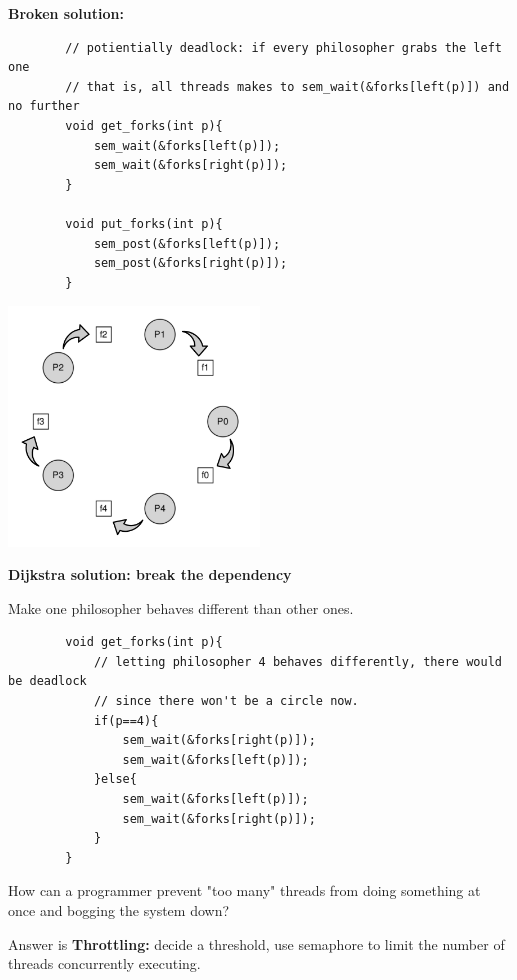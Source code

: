     \textbf{Broken solution:}

    \begin{lstlisting}
        // potientially deadlock: if every philosopher grabs the left one
        // that is, all threads makes to sem_wait(&forks[left(p)]) and no further
        void get_forks(int p){
            sem_wait(&forks[left(p)]);
            sem_wait(&forks[right(p)]);
        }

        void put_forks(int p){
            sem_post(&forks[left(p)]);
            sem_post(&forks[right(p)]);
        }
    \end{lstlisting}

    \includegraphics[width=0.5\textwidth]{chapters/Cucurrency/Cucurrency/dp_deadlock.png}

    \textbf{Dijkstra solution: break the dependency}

    Make one philosopher behaves different than other ones.

    \begin{lstlisting}
        void get_forks(int p){
            // letting philosopher 4 behaves differently, there would be deadlock
            // since there won't be a circle now.
            if(p==4){
                sem_wait(&forks[right(p)]);
                sem_wait(&forks[left(p)]);
            }else{
                sem_wait(&forks[left(p)]);
                sem_wait(&forks[right(p)]);
            }
        }
    \end{lstlisting}


    How can a programmer prevent "too many" threads from doing something at once and 
    bogging the system down?

    Answer is \textbf{Throttling:} decide a threshold, use semaphore to limit the number of threads 
    concurrently executing.


